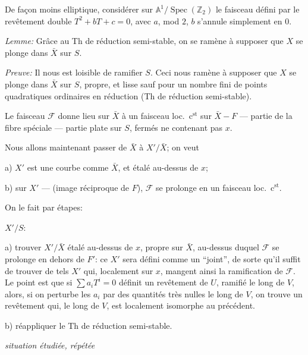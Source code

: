 \documentclass[11pt,a4paper]{article}
\theoremstyle{plain}
\theoremstyle{definition}
\DeclareMathOperator{\Spec}{Spec}
\begin{document}
\medskip

De fa\c{c}on moins elliptique, consid\'erer sur $\mathbb{A}^1/\Spec(\mathbb{Z}_2)$ le faisceau d\'efini par le rev\^etement double $T^2 + bT + c = 0$, avec $a$, mod $2$, $b$ s'annule simplement en $0$.

\medskip

\noindent \textit{Lemme:} Gr\^ace au Th de r\'eduction semi-stable, on se ram\`ene \`a supposer que $X$ se plonge dans $\bar{X}$ sur $S$.

\medskip

\noindent \textit{Preuve:} Il nous est loisible de ramifier $S$. Ceci nous ram\`ene \`a supposer que $X$ se plonge dans $\bar{X}$ sur $S$, propre, et lisse sauf pour un nombre fini de points quadratiques ordinaires en r\'eduction (Th de r\'eduction semi-stable).

Le faisceau $\mathcal{F}$ donne lieu sur $\bar{X}$ \`a un faisceau loc.\ c$^{\text{st}}$ sur $\bar{X} - F$ --- partie de la fibre sp\'eciale --- partie plate sur $S$, ferm\'es ne contenant pas $x$.

\medskip

Nous allons maintenant passer de $\bar{X}$ \`a $X'/\bar{X}$; on veut

a) $X'$ est une courbe comme $\bar{X}$, et \'etal\'e au-dessus de $x$;

b) sur $X'$ --- (image r\'eciproque de $F$), $\mathcal{F}$ se prolonge en un faisceau loc.\ c$^{\text{st}}$.

\medskip

On le fait par \'etapes:

\medskip

$X'/S$:

a) trouver $X'/\bar{X}$ \'etal\'e au-dessus de $x$, propre sur $\bar{X}$, au-dessus duquel $\mathcal{F}$ se prolonge en dehors de $F'$: ce $X'$ sera d\'efini comme un ``joint'', de sorte qu'il suffit de trouver de tels $X'$ qui, localement sur $x$, mangent ainsi la ramification de $\mathcal{F}$. Le point est que si $\sum a_i T^i = 0$ d\'efinit un rev\^etement de $U$, ramifi\'e le long de $V$, alors, si on perturbe les $a_i$ par des quantit\'es tr\`es nulles le long de $V$, on trouve un rev\^etement qui, le long de $V$, est localement isomorphe au pr\'ec\'edent.

b) r\'eappliquer le Th de r\'eduction semi-stable.

\medskip

\noindent \textit{situation \'etudi\'ee, r\'ep\'et\'ee}
\end{document}
